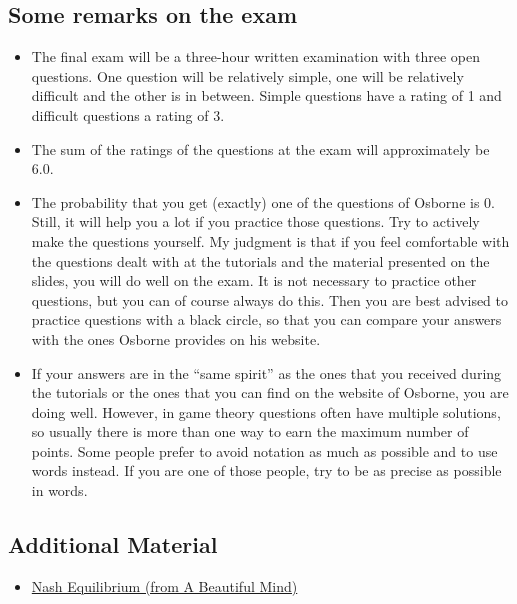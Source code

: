 \subsection{Some remarks on the exam}
\begin{itemize}
\item The final exam will be a three-hour written examination with three open questions. One question will be relatively simple, one will be
relatively difficult and the other is in between. Simple questions have a rating of 1 and
difficult questions a rating of 3. 
\item The sum of the ratings of the questions at the exam will approximately be 6.0. 
\item The probability that you get (exactly) one of the questions of Osborne is 0. Still, it will help
you a lot if you practice those questions. Try to actively make the questions yourself.
My judgment is that if you feel comfortable with the questions dealt with at the tutorials and
the material presented on the slides, you will do well on the exam. It is not necessary to
practice other questions, but you can of course always do this. Then you are best advised to
practice questions with a black circle, so that you can compare your answers with the ones
Osborne provides on his website.
\item If your answers are in the ``same spirit'' as the ones that you received during the tutorials or
the ones that you can find on the website of Osborne, you are doing well. However, in game
theory questions often have multiple solutions, so usually there is more than one way to earn
the maximum number of points. Some people prefer to avoid notation as much as possible
and to use words instead. If you are one of those people, try to be as precise as possible in
words.
\end{itemize}

\subsection{Additional Material}
\begin{itemize}
\item \href{https://www.youtube.com/watch?v=2d_dtTZQyUM}{Nash Equilibrium (from A Beautiful Mind)}
\end{itemize}